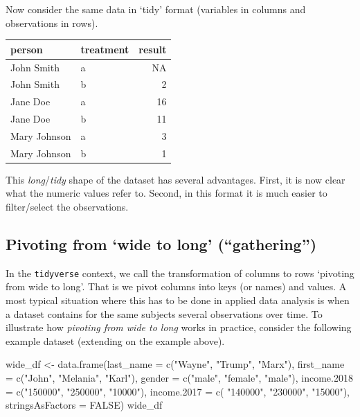 \documentclass[
  12pt,
]{style/krantz}
\newenvironment{Shaded}{\begin{snugshade}}{\end{snugshade}}
\newcommand{\AttributeTok}[1]{\textcolor[rgb]{0.77,0.63,0.00}{#1}}
\newcommand{\ConstantTok}[1]{\textcolor[rgb]{0.00,0.00,0.00}{#1}}
\newcommand{\FunctionTok}[1]{\textcolor[rgb]{0.00,0.00,0.00}{#1}}
\newcommand{\NormalTok}[1]{#1}
\newcommand{\OtherTok}[1]{\textcolor[rgb]{0.56,0.35,0.01}{#1}}
\newcommand{\StringTok}[1]{\textcolor[rgb]{0.31,0.60,0.02}{#1}}
\begin{document}
Now consider the same data in `tidy' format (variables in columns and observations in rows).

\begin{tabular}{l|l|r}
\hline
person & treatment & result\\
\hline
John Smith & a & NA\\
\hline
John Smith & b & 2\\
\hline
Jane Doe & a & 16\\
\hline
Jane Doe & b & 11\\
\hline
Mary Johnson & a & 3\\
\hline
Mary Johnson & b & 1\\
\hline
\end{tabular}

This \emph{long}/\emph{tidy} shape of the dataset has several advantages. First, it is now clear what the numeric values refer to. Second, in this format it is much easier to filter/select the observations.

\hypertarget{pivoting-from-wide-to-long-gathering}{%
\subsection{Pivoting from `wide to long' (``gathering'')}\label{pivoting-from-wide-to-long-gathering}}

In the \texttt{tidyverse} context, we call the transformation of columns to rows `pivoting from wide to long'. That is we pivot columns into keys (or names) and values. A most typical situation where this has to be done in applied data analysis is when a dataset contains for the same subjects several observations over time. To illustrate how \emph{pivoting from wide to long} works in practice, consider the following example dataset (extending on the example above).

\begin{Shaded}
\begin{Highlighting}[]
\NormalTok{wide\_df }\OtherTok{\textless{}{-}} \FunctionTok{data.frame}\NormalTok{(}\AttributeTok{last\_name =} \FunctionTok{c}\NormalTok{(}\StringTok{"Wayne"}\NormalTok{, }\StringTok{"Trump"}\NormalTok{, }\StringTok{"Marx"}\NormalTok{),}
                       \AttributeTok{first\_name =} \FunctionTok{c}\NormalTok{(}\StringTok{"John"}\NormalTok{, }\StringTok{"Melania"}\NormalTok{, }\StringTok{"Karl"}\NormalTok{),}
                       \AttributeTok{gender =} \FunctionTok{c}\NormalTok{(}\StringTok{"male"}\NormalTok{, }\StringTok{"female"}\NormalTok{, }\StringTok{"male"}\NormalTok{),}
                       \AttributeTok{income.2018 =} \FunctionTok{c}\NormalTok{(}\StringTok{"150000"}\NormalTok{, }\StringTok{"250000"}\NormalTok{, }\StringTok{"10000"}\NormalTok{),}
                      \AttributeTok{income.2017 =} \FunctionTok{c}\NormalTok{( }\StringTok{"140000"}\NormalTok{, }\StringTok{"230000"}\NormalTok{, }\StringTok{"15000"}\NormalTok{),}
                      \AttributeTok{stringsAsFactors =} \ConstantTok{FALSE}\NormalTok{)}
\NormalTok{wide\_df}
\end{Highlighting}
\end{Shaded}
\end{document}
